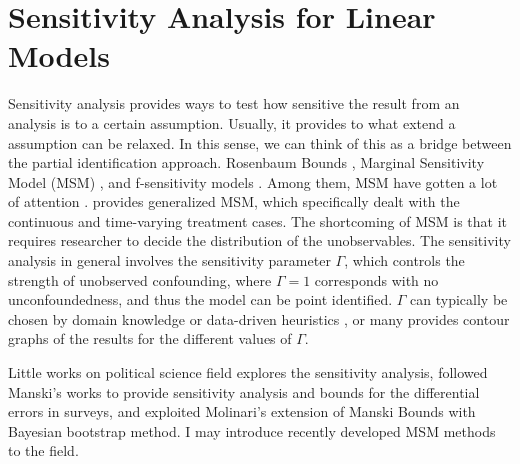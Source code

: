 \documentclass[10pt]{extarticle}
\begin{document}
\newpage
\section{Sensitivity Analysis for Linear Models}
Sensitivity analysis provides ways to test how sensitive the result from an analysis is to a certain assumption. Usually, it provides to what extend a assumption can be relaxed. In this sense, we can think of this as a bridge between the partial identification approach. Rosenbaum Bounds \citep{Rosenbaum1987a}, Marginal Sensitivity Model (MSM) \citep{Tan2006a}, and f-sensitivity models \citep{Jin2022a}. Among them, MSM have gotten a lot of attention \citep{Kallus2019a, Zhao2019a}. \citet{Frauen2023a} provides generalized MSM, which specifically dealt with the continuous and time-varying treatment cases. The shortcoming of MSM is that it requires researcher to decide the distribution of the unobservables.  The sensitivity analysis in general involves the sensitivity parameter $\Gamma$, which controls the strength of unobserved confounding, where $\Gamma = 1$ corresponds with no unconfoundedness, and thus the model can be point identified. $\Gamma$ can typically be chosen by domain knowledge or data-driven heuristics \citep{Kallus2019a}, or many provides contour graphs of the results for the different values of $\Gamma$. 

Little works on political science field explores the sensitivity analysis, \citet{Imai2010a} followed Manski's works to provide sensitivity analysis and bounds for the differential errors in surveys, and \citet{Mebane2013a} exploited Molinari's extension of Manski Bounds with Bayesian bootstrap method. I may introduce recently developed MSM methods to the field.




\end{document}
